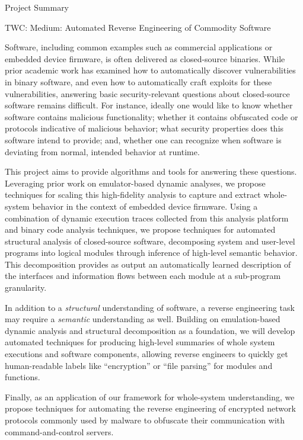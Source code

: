 \documentclass[letterpaper,twoside,11pt,headings=small]{scrartcl}
\newcommand{\basetitle}{TWC: Medium: Automated Reverse Engineering of Commodity Software}
\newcommand{\thetitle}{\basetitle\xspace}
\begin{document}

{\sffamily\bfseries
\begin{center}
\fontsize{16}{16}\selectfont Project Summary

\fontsize{13}{13}\selectfont \thetitle
\end{center}
\label{sec:summary}
}

Software, including common examples such as commercial applications or
embedded device firmware, is often delivered as closed-source binaries.  While
prior academic work has examined how to automatically discover vulnerabilities
in binary software, and even how to automatically craft exploits for these
vulnerabilities, answering basic security-relevant questions about
closed-source software remains difficult.  For instance, ideally one would like to
know whether software contains malicious functionality; whether it contains
obfuscated code or protocols indicative of malicious behavior; what security
properties does this software intend to provide; and, whether one can
recognize when software is deviating from normal, intended behavior at
runtime.

This project aims to provide algorithms and tools for answering these questions.
Leveraging prior work on emulator-based dynamic analyses, we propose techniques
for scaling this high-fidelity analysis to capture and extract whole-system
behavior in the context of embedded device firmware.  Using a combination of
dynamic execution traces collected from this analysis platform and binary code
analysis techniques, we propose techniques for automated structural analysis of
closed-source software, decomposing system and user-level programs into logical
modules through inference of high-level semantic behavior.  This decomposition
provides as output an automatically learned description of the interfaces and
information flows between each module at a sub-program granularity.

In addition to a \emph{structural} understanding of software, a reverse
engineering task may require a \emph{semantic} understanding as well. Building
on emulation-based dynamic analysis and structural decomposition as a
foundation, we will develop automated techniques for producing high-level
summaries of whole system executions and software components, allowing reverse
engineers to quickly get human-readable labels like ``encryption'' or ``file
parsing'' for modules and functions.

Finally, as an application of our framework for whole-system understanding, we
propose techniques for automating the reverse engineering of encrypted network
protocols commonly used by malware to obfuscate their communication with
command-and-control servers.
\end{document}

